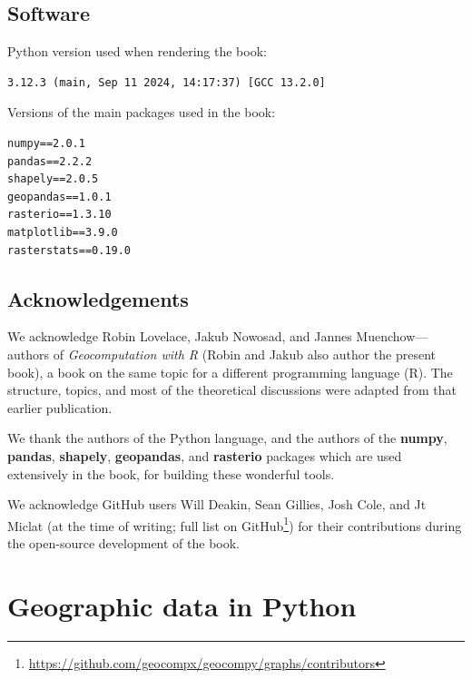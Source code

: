 \documentclass[
  letterpaper,
]{krantz}
\begin{document}
\section*{Software}\label{software}


Python version used when rendering the book:

\begin{verbatim}
3.12.3 (main, Sep 11 2024, 14:17:37) [GCC 13.2.0]
\end{verbatim}

Versions of the main packages used in the book:

\begin{verbatim}
numpy==2.0.1
pandas==2.2.2
shapely==2.0.5
geopandas==1.0.1
rasterio==1.3.10
matplotlib==3.9.0
rasterstats==0.19.0
\end{verbatim}

\section*{Acknowledgements}\label{acknowledgements}


We acknowledge Robin Lovelace, Jakub Nowosad, and Jannes
Muenchow---authors of \emph{Geocomputation with R} (Robin and Jakub also
author the present book), a book on the same topic for a different
programming language (R). The structure, topics, and most of the
theoretical discussions were adapted from that earlier publication.

We thank the authors of the Python language, and the authors of the
\textbf{numpy}, \textbf{pandas}, \textbf{shapely}, \textbf{geopandas},
and \textbf{rasterio} packages which are used extensively in the book,
for building these wonderful tools.

We acknowledge GitHub users Will Deakin, Sean Gillies, Josh Cole, and Jt
Miclat (at the time of writing; full list on GitHub\footnote{\url{https://github.com/geocompx/geocompy/graphs/contributors}})
for their contributions during the open-source development of the book.


\chapter{Geographic data in Python}\label{sec-spatial-class}
\end{document}
